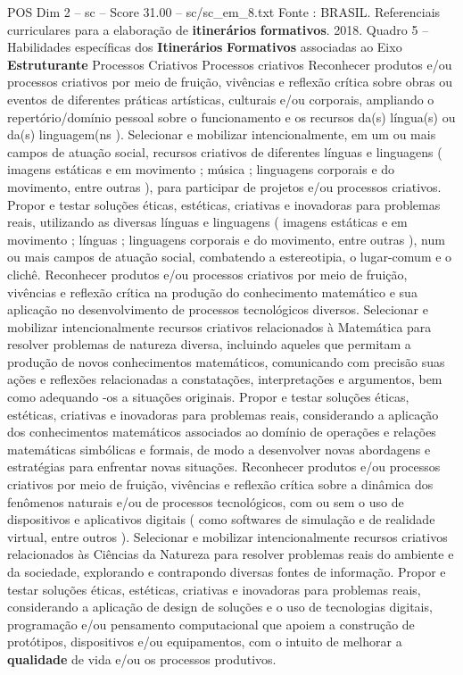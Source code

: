 \begin{textsample}{POS Dim 2 – sc – Score 31.00 – sc/sc\_em\_8.txt}
Fonte : BRASIL.
Referenciais curriculares para a elaboração de \textbf{itinerários} \textbf{formativos}. 2018.
Quadro 5 – Habilidades específicas dos \textbf{Itinerários} \textbf{Formativos} associadas ao Eixo \textbf{Estruturante} Processos Criativos Processos criativos Reconhecer produtos e/ou processos criativos por meio de fruição, vivências e reflexão crítica sobre obras ou eventos de diferentes práticas artísticas, culturais e/ou corporais, ampliando o repertório/domínio pessoal sobre o funcionamento e os recursos da(s) língua(s) ou da(s) linguagem(ns ).
Selecionar e mobilizar intencionalmente, em um ou mais campos de atuação social, recursos criativos de diferentes línguas e linguagens ( imagens estáticas e em movimento ; música ; linguagens corporais e do movimento, entre outras ), para participar de projetos e/ou processos criativos.
Propor e testar soluções éticas, estéticas, criativas e inovadoras para problemas reais, utilizando as diversas línguas e linguagens ( imagens estáticas e em movimento ; línguas ; linguagens corporais e do movimento, entre outras ), num ou mais campos de atuação social, combatendo a estereotipia, o lugar-comum e o clichê.
Reconhecer produtos e/ou processos criativos por meio de fruição, vivências e reflexão crítica na produção do conhecimento matemático e sua aplicação no desenvolvimento de processos tecnológicos diversos.
Selecionar e mobilizar intencionalmente recursos criativos relacionados à Matemática para resolver problemas de natureza diversa, incluindo aqueles que permitam a produção de novos conhecimentos matemáticos, comunicando com precisão suas ações e reflexões relacionadas a constatações, interpretações e argumentos, bem como adequando -os a situações originais.
Propor e testar soluções éticas, estéticas, criativas e inovadoras para problemas reais, considerando a aplicação dos conhecimentos matemáticos associados ao domínio de operações e relações matemáticas simbólicas e formais, de modo a desenvolver novas abordagens e estratégias para enfrentar novas situações.
Reconhecer produtos e/ou processos criativos por meio de fruição, vivências e reflexão crítica sobre a dinâmica dos fenômenos naturais e/ou de processos tecnológicos, com ou sem o uso de dispositivos e aplicativos digitais ( como softwares de simulação e de realidade virtual, entre outros ).
Selecionar e mobilizar intencionalmente recursos criativos relacionados às Ciências da Natureza para resolver problemas reais do ambiente e da sociedade, explorando e contrapondo diversas fontes de informação.
Propor e testar soluções éticas, estéticas, criativas e inovadoras para problemas reais, considerando a aplicação de design de soluções e o uso de tecnologias digitais, programação e/ou pensamento computacional que apoiem a construção de protótipos, dispositivos e/ou equipamentos, com o intuito de melhorar a \textbf{qualidade} de vida e/ou os processos produtivos.

\end{textsample}
